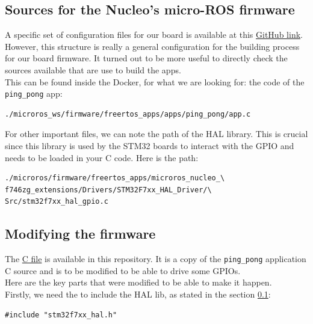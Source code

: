 \documentclass[10pt]{article}
\begin{document}
\subsection{Sources for the Nucleo's micro-ROS firmware}
\label{sec:sourc-nucl-micro}
A specific set of configuration files for our board is available at this \href{https://github.com/micro-ROS/micro_ros_setup/tree/humble/config/freertos/nucleo_f746zg}{GitHub link}.\\
However, this structure is really a general configuration for the building process for our board firmware. It turned out to be more useful to directly check the sources available that are use to build the apps.\\
This can be found inside the Docker, for what we are looking for: the code of the \verb|ping_pong| app:
\begin{tcolorbox}
\begin{verbatim}
./microros_ws/firmware/freertos_apps/apps/ping_pong/app.c
\end{verbatim}
\end{tcolorbox}

For other important files, we can note the path of the HAL library. This is crucial since this library is used by the STM32 boards to interact with the GPIO and needs to be loaded in your C code. Here is the path:
\begin{tcolorbox}
\begin{verbatim}
./microros/firmware/freertos_apps/microros_nucleo_\
f746zg_extensions/Drivers/STM32F7xx_HAL_Driver/\
Src/stm32f7xx_hal_gpio.c
\end{verbatim}
\end{tcolorbox}

\subsection{Modifying the firmware}
\label{sec:modifying-firmware}
The \href{https://gitlab.com/nucleo-144/documentation/-/blob/main/src/ping_pong.c}{C file} is available in this repository. It is a copy of the \verb|ping_pong| application C source and is to be modified to be able to drive some GPIOs.\\

Here are the key parts that were modified to be able to make it happen.\\

Firstly, we need the to include the HAL lib, as stated in the section \ref{sec:sourc-nucl-micro}:
\begin{tcolorbox}
\begin{verbatim}
#include "stm32f7xx_hal.h"
\end{verbatim}
\end{tcolorbox}
\end{document}
